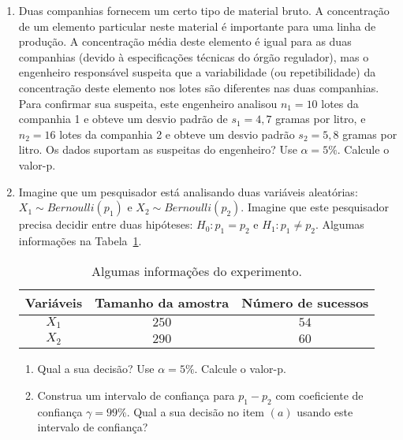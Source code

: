 \documentclass[8pt, a4paper]{article}
\begin{document}
\begin{enumerate}
	\item Duas companhias fornecem um certo tipo de material bruto. A concentração de um elemento particular neste material é importante para uma linha de produção. A concentração média deste elemento é igual para as duas companhias (devido à especificações técnicas do órgão regulador), mas o engenheiro responsável suspeita que a variabilidade (ou repetibilidade) da concentração deste elemento nos lotes são diferentes nas duas companhias. Para confirmar sua suspeita, este engenheiro analisou $n_1=10$ lotes da companhia 1 e obteve um desvio padrão de $s_1=4,7$ gramas por litro, e $n_2=16$ lotes da companhia 2 e obteve um desvio padrão $s_2 = 5,8$ gramas por litro. Os dados suportam as suspeitas do engenheiro? Use $\alpha=5\%$. Calcule o valor-p.
	
	\item Imagine que um pesquisador está analisando duas variáveis aleatórias: $X_1 \sim Bernoulli(p_1)$ e $X_2 \sim Bernoulli(p_2)$. Imagine que este pesquisador precisa decidir entre duas hipóteses: $H_0: p_1 = p_2$ e $H_1: p_1 \neq p_2$.  Algumas informações na Tabela~\ref{tab:2-pop-prop-bilateral}.
	\begin{table}[htbp]
		\centering
		\begin{tabular}{c|cc}
			\toprule[0.05cm]
			Variáveis & Tamanho da amostra & Número de sucessos \\ \midrule[0.025cm]
			$X_1$ & $250$ & $54$\\
			$X_2$ & $290$ & $60$\\ 
			\bottomrule[0.05cm]
		\end{tabular}
		\caption{Algumas informações do experimento.}
		\label{tab:2-pop-prop-bilateral}
	\end{table}
	\begin{enumerate}
		\item Qual a sua decisão? Use $\alpha = 5\%$. Calcule o valor-p.
		\item Construa um intervalo de confiança para $p_1 - p_2$ com coeficiente de confiança $\gamma=99\%$. Qual a sua decisão no item $(a)$ usando este intervalo de confiança?
	\end{enumerate}


\end{enumerate}
\end{document}
